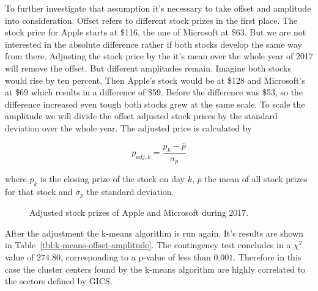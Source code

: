 To further investigate that assumption it's necessary to take offset and amplitude into consideration. Offset refers to different stock prizes in the first place. The stock price for Apple starts at \$116, the one of Microsoft at \$63. But we are not interested in the absolute difference rather if both stocks develop the same way from there. Adjusting the stock price by the it's mean over the whole year of 2017 will remove the offset. But different amplitudes remain. Imagine both stocks would rise by ten percent. Then Apple's stock would be at \$128 and Microsoft's at \$69 which results in a difference of \$59. Before the difference was \$53, so the difference increased even tough both stocks grew at the same scale. To scale the amplitude we will divide the offset adjusted stock prices by the standard deviation over the whole year. The adjusted price is calculated by 

\begin{equation}\label{eq:off-amp-adj}
	p_{adj, k} = \frac{p_k - \overline{p}}{\sigma_p}
\end{equation}

where $p_k$ is the closing prize of the stock on day $k$, $\overline{p}$ the mean of all stock prizes for that stock and $\sigma_p$ the standard deviation.

\begin{figure}\label{fig:appl-vs-msft_adj}
	\centering
	
	\caption{Adjusted stock prizes of Apple and Microsoft during 2017.}
\end{figure}

After the adjustment the k-means algorithm is run again. It's results are shown in Table~\ref{tbl:k-means-offset-amplitude}. The contingency test concludes in a $\chi^2$ value of $274.80$, corresponding to a p-value of less than $0.001$. Therefore in this case the cluster centers found by the k-means algorithm are highly correlated to the sectors defined by GICS.



